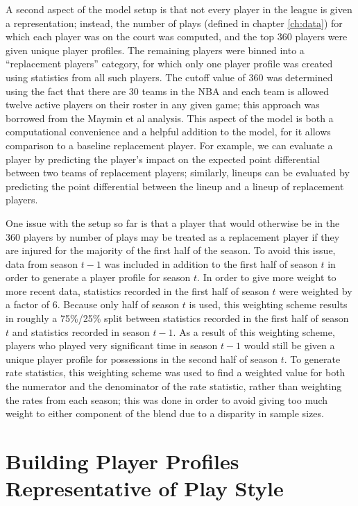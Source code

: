 A second aspect of the model setup is that not every player in the league is given a
representation; instead, the number of plays (defined in chapter \ref{ch:data}) for
which each player was on the court was computed, and the top 360 players were given
unique player profiles. The remaining players were binned into a ``replacement
players'' category, for which only one player profile was created using statistics
from all such players. The cutoff value of 360 was determined using the fact that
there are 30 teams in the NBA and each team is allowed twelve active players on
their roster in any given game; this approach was borrowed from the Maymin et al
analysis. This aspect of the model is both a computational convenience and a helpful
addition to the model, for it allows comparison to a baseline replacement player.
For example, we can evaluate a player by predicting the player's impact on the
expected point differential between two teams of replacement players; similarly,
lineups can be evaluated by predicting the point differential between the lineup and
a lineup of replacement players.

One issue with the setup so far is that a player that would otherwise be in the 360
players by number of plays may be treated as a replacement player if they are
injured for the majority of the first half of the season. To avoid this issue, data
from season $t-1$ was included in addition to the first half of season $t$ in order
to generate a player profile for season $t$. In order to give more weight to more
recent data, statistics recorded in the first half of season $t$ were weighted by a
factor of 6. Because only half of season $t$ is used, this weighting scheme results
in roughly a 75\%/25\% split between statistics recorded in the first half of season
$t$ and statistics recorded in season $t-1$. As a result of this weighting scheme,
players who played very significant time in season $t-1$ would still be given a
unique player profile for possessions in the second half of season $t$. To generate
rate statistics, this weighting scheme was used to find a weighted value for both
the numerator and the denominator of the rate statistic, rather than weighting the
rates from each season; this was done in order to avoid giving too much weight to
either component of the blend due to a disparity in sample sizes.

\section{Building Player Profiles Representative of Play Style}
\label{sec:profiles}

